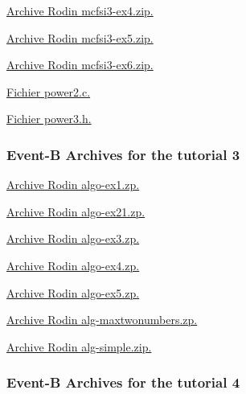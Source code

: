 \documentclass[ 12pt]{article}
\begin{document}
\href{http://mery54.github.io/teaching/mosos/models/mcfsi3-ex4.zip}{Archive 
  Rodin  mcfsi3-ex4.zip.}



\href{http://mery54.github.io/teaching/mosos/models/mcfsi3-ex5.zip}{Archive 
  Rodin  mcfsi3-ex5.zip.}




\href{http://mery54.github.io/teaching/mosos/models/mcfsi3-ex6.zip}{Archive 
  Rodin  mcfsi3-ex6.zip.}



\href{http://mery54.github.io/teaching/mosos/codes/power3.c}{Fichier 
  power2.c.}

\href{http://mery54.github.io/teaching/mosos/codes/power2.h}{Fichier 
  power3.h.}



 \subsubsection{Event-B Archives for   the tutorial   3}
\label{sec:event-b-archives}


\href{http://mery54.github.io/teaching/mosos/models/algo-ex1.zip}{Archive 
  Rodin  algo-ex1.zp.}

\href{http://mery54.github.io/teaching/mosos/models/algo-ex21.zip}{Archive 
  Rodin  algo-ex21.zp.}

\href{http://mery54.github.io/teaching/mosos/models/algo-ex3.zip}{Archive 
  Rodin  algo-ex3.zp.}

\href{http://mery54.github.io/teaching/mosos/models/algo-ex4.zip}{Archive 
  Rodin  algo-ex4.zp.}


\href{http://mery54.github.io/teaching/mosos/models/algo-ex5.zip}{Archive 
  Rodin  algo-ex5.zp.}



\href{http://mery54.github.io/teaching/mosos/models/alg-maxtwonumbers.zip}{Archive 
  Rodin  alg-maxtwonumbers.zp.}








\href{http://mery54.github.io/teaching/mosos/models/alg-simple.zip}{Archive 
  Rodin  alg-simple.zip.}



 \subsubsection{Event-B Archives for   the tutorial 4}
\label{sec:event-b-archives}
\end{document}
